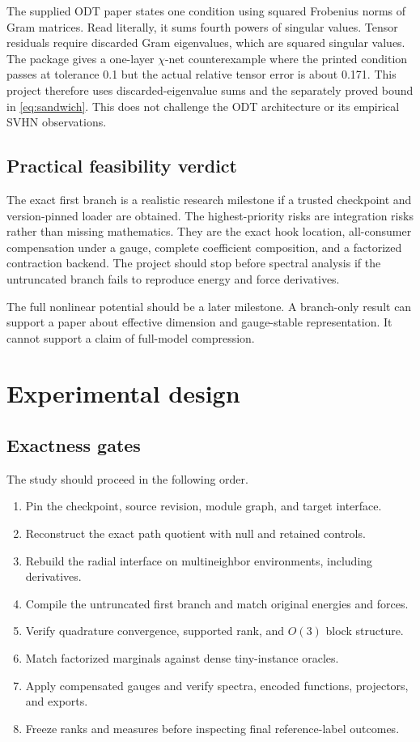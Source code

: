 \documentclass[10pt,twocolumn]{article}
\begin{document}
The supplied ODT paper states one condition using squared Frobenius norms of Gram matrices. Read literally, it sums fourth powers of singular values. Tensor residuals require discarded Gram eigenvalues, which are squared singular values. The package gives a one-layer $\chi$-net counterexample where the printed condition passes at tolerance 0.1 but the actual relative tensor error is about 0.171. This project therefore uses discarded-eigenvalue sums and the separately proved bound in \cref{eq:sandwich}. This does not challenge the ODT architecture or its empirical SVHN observations.

\subsection{Practical feasibility verdict}

The exact first branch is a realistic research milestone if a trusted checkpoint and version-pinned loader are obtained. The highest-priority risks are integration risks rather than missing mathematics. They are the exact hook location, all-consumer compensation under a gauge, complete coefficient composition, and a factorized contraction backend. The project should stop before spectral analysis if the untruncated branch fails to reproduce energy and force derivatives.

The full nonlinear potential should be a later milestone. A branch-only result can support a paper about effective dimension and gauge-stable representation. It cannot support a claim of full-model compression.

\section{Experimental design}

\subsection{Exactness gates}

The study should proceed in the following order.

\begin{enumerate}[leftmargin=1.3em]
\item Pin the checkpoint, source revision, module graph, and target interface.
\item Reconstruct the exact path quotient with null and retained controls.
\item Rebuild the radial interface on multineighbor environments, including derivatives.
\item Compile the untruncated first branch and match original energies and forces.
\item Verify quadrature convergence, supported rank, and $O(3)$ block structure.
\item Match factorized marginals against dense tiny-instance oracles.
\item Apply compensated gauges and verify spectra, encoded functions, projectors, and exports.
\item Freeze ranks and measures before inspecting final reference-label outcomes.
\end{enumerate}
\end{document}
